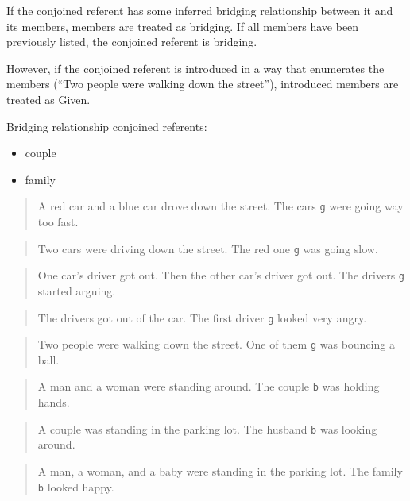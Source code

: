 \documentclass[
]{book}
\providecommand{\tightlist}{%
  \setlength{\itemsep}{0pt}\setlength{\parskip}{0pt}}
\begin{document}
If the conjoined referent has some inferred bridging relationship between it and its members, members are treated as bridging.
If all members have been previously listed, the conjoined referent is bridging.

However, if the conjoined referent is introduced in a way that enumerates the members (``Two people were walking down the street''),
introduced members are treated as Given.

Bridging relationship conjoined referents:

\begin{itemize}
\tightlist
\item
  couple
\item
  family
\end{itemize}

\begin{quote}
A red car and a blue car drove down the street.
The cars \texttt{g} were going way too fast.
\end{quote}

\begin{quote}
Two cars were driving down the street.
The red one \texttt{g} was going slow.
\end{quote}

\begin{quote}
One car's driver got out.
Then the other car's driver got out.
The drivers \texttt{g} started arguing.
\end{quote}

\begin{quote}
The drivers got out of the car.
The first driver \texttt{g} looked very angry.
\end{quote}

\begin{quote}
Two people were walking down the street.
One of them \texttt{g} was bouncing a ball.
\end{quote}

\begin{quote}
A man and a woman were standing around.
The couple \texttt{b} was holding hands.
\end{quote}

\begin{quote}
A couple was standing in the parking lot.
The husband \texttt{b} was looking around.
\end{quote}

\begin{quote}
A man, a woman, and a baby were standing in the parking lot.
The family \texttt{b} looked happy.
\end{quote}
\end{document}
